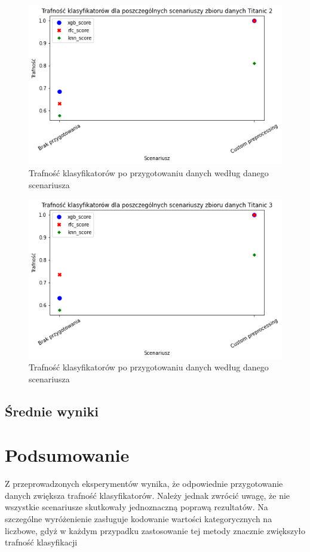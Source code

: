 \documentclass{book}
\begin{document}
\begin{figure}[H]
\centerline{\includegraphics[scale=0.5]{Titanic_2_Custom}}
\centering
\caption{Trafność klasyfikatorów po przygotowaniu danych 
według danego scenariusza}
\end{figure}

\begin{figure}[H]
\centerline{\includegraphics[scale=0.5]{Titanic_3_Custom}}
\centering
\caption{Trafność klasyfikatorów po przygotowaniu danych 
według danego scenariusza}
\end{figure}


\section{Średnie wyniki}


\chapter{Podsumowanie}
Z przeprowadzonych eksperymentów wynika, 
że odpowiednie przygotowanie danych zwiększa trafność 
klasyfikatorów. Należy jednak zwrócić uwagę, że nie wszystkie 
scenariusze skutkowały jednoznaczną poprawą rezultatów. 
Na szczególne wyróżenienie zasługuje kodowanie wartości 
kategorycznych na liczbowe, gdyż w każdym przypadku zastosowanie 
tej metody znacznie zwiększyło trafność klasyfikacji
\end{document}
